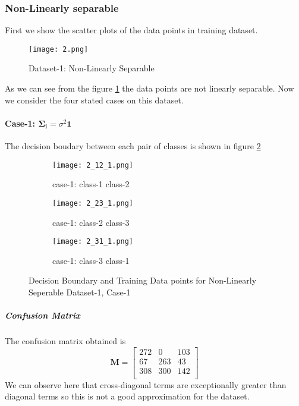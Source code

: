 \documentclass[a4paper]{article}
\begin{document}
\subsubsection{Non-Linearly separable}
First we show the scatter plots of the data points in training dataset.
\begin{figure}[!h]
  \texttt{[image: 2.png]}
  \caption{Dataset-1: Non-Linearly Separable}
  \label{fig:Non Linearly Separable}
\end{figure}
As we can see from the figure \ref{fig:Non Linearly Separable} the data points are not linearly separable. Now we consider the four stated cases on this dataset.
\newpage
\paragraph{Case-1: $\mathbf{\Sigma_{i}}=\sigma^{2}\mathbf{1}$} 
The decision boudary between each pair of classes is shown in figure \ref{fig:2_1}
\begin{figure}[h]
  \centering
  \begin{subfigure}[b]{0.4\linewidth}
    \texttt{[image: 2\_12\_1.png]}
     \caption{case-1: class-1 class-2}
  \end{subfigure}
  \begin{subfigure}[b]{0.4\linewidth}
    \texttt{[image: 2\_23\_1.png]}
    \caption{case-1: class-2 class-3}
  \end{subfigure}
  \begin{subfigure}[b]{0.4\linewidth}
    \texttt{[image: 2\_31\_1.png]}
    \caption{case-1: class-3 class-1}
  \end{subfigure}
  \caption{Decision Boundary and Training Data points for Non-Linearly Seperable Dataset-1, Case-1}
  \label{fig:2_1}
\end{figure}
\subparagraph{Confusion Matrix}
The confusion matrix obtained is
\[
\mathbf{M} = \left[ {\begin{array}{ccc}
272 & 0 & 103\\
67 & 263 & 43\\
308 & 300 & 142\\
\end{array}} \right]
\]We can observe here that cross-diagonal terms are exceptionally greater than diagonal terms so this is not a good approximation for the dataset.
\end{document}
